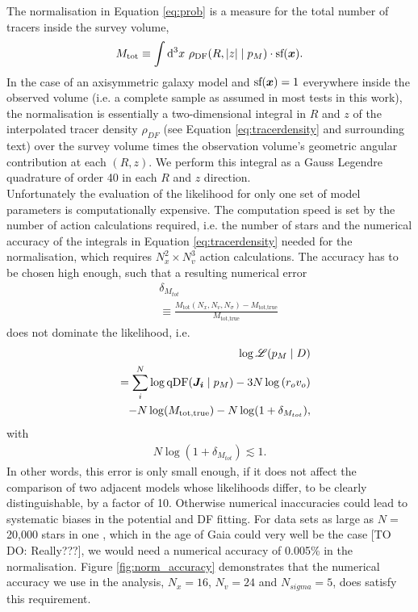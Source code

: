 The normalisation in Equation \ref{eq:prob} is a measure for the total number of tracers inside the survey volume,
\begin{equation}
M_\text{tot} \equiv \int \mathop{}\!\mathrm{d^3} x \  \rho_\text{DF}(R,|z| \mid p_M) \cdot \text{sf}(\boldsymbol{x}).\label{eq:normalisation}
\end{equation}
In the case of an axisymmetric galaxy model and $\text{sf}(\boldsymbol{x})=1$ everywhere inside the observed volume (i.e. a complete sample as assumed in most tests in this work), the normalisation is essentially a two-dimensional integral in $R$ and $z$ of the interpolated tracer density $\rho_{DF}$ (see Equation \ref{eq:tracerdensity} and surrounding text) over the survey volume times the observation volume's geometric angular contribution at each $(R,z)$. We perform this integral as a Gauss Legendre quadrature of order 40 in each $R$ and $z$ direction.
\\Unfortunately the evaluation of the likelihood for only one set of model parameters is computationally expensive. The computation speed is set by the number of action calculations required, i.e. the number of stars and the numerical accuracy of the integrals in Equation \ref{eq:tracerdensity} needed for the normalisation, which requires $N_x^2 \times N_v^3$ action calculations. The accuracy has to be chosen high enough, such that a resulting numerical error 
\begin{eqnarray}
&&\delta_{M_{tot}} \nonumber\\
&&\equiv \frac{M_\text{tot}(N_x,N_v,N_\sigma) -  M_\text{tot,true} }{M_\text{tot,true}}\label{eq:relerrlikelihood}
\end{eqnarray}
does not dominate the likelihood, i.e.
\begin{eqnarray}
& &\log \mathscr{L}(p_M \mid D) \nonumber\\
&& = \sum_i^{N} \log \text{qDF}(\boldsymbol{J_i} \mid p_M) - 3N \log \left( r_o v_o\right)\nonumber\\
& & -N \log(M_\text{tot,true}) - N \log (1 + \delta_{M_{tot}}),\label{eq:loglikelihood_relerr}
\end{eqnarray}
with
\begin{eqnarray}
N \log (1 + \delta_{M_{tot}}) \lesssim 1.\nonumber
\end{eqnarray}
In other words, this error is only small enough, if it does not affect the comparison of two adjacent models whose likelihoods differ, to be clearly distinguishable, by a factor of 10. Otherwise numerical inaccuracies could lead to systematic biases in the potential and DF fitting. For data sets as large as $N =$ 20,000 stars in one \MAP{}, which in the age of Gaia could very well be the case [TO DO: Really???], we would need a numerical accuracy of 0.005\% in the normalisation. Figure \ref{fig:norm_accuracy} demonstrates that the numerical accuracy we use in the analysis, $N_x=16$, $N_v=24$ and $N_{sigma}=5$, does satisfy this requirement.

